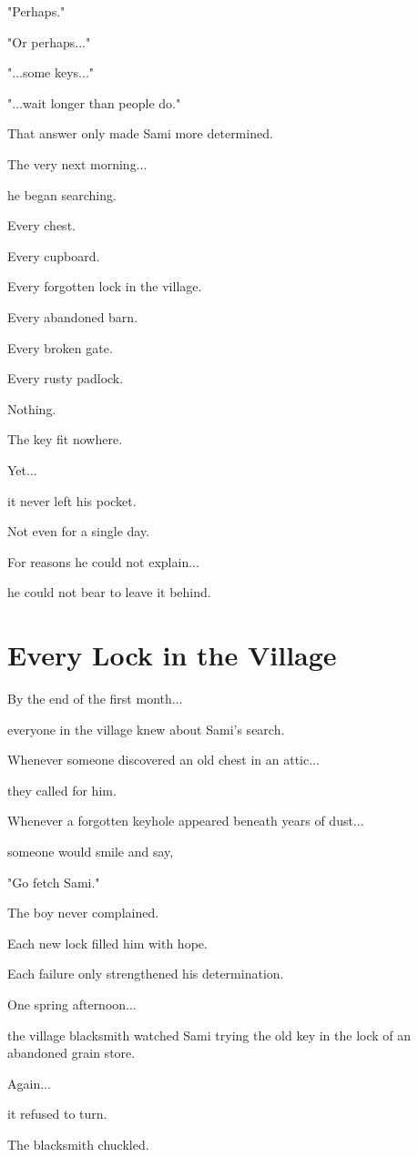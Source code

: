 \documentclass[12pt,openany]{book}
\begin{document}
"Perhaps."

"Or perhaps..."

"...some keys..."

"...wait longer than people do."

That answer only made Sami more determined.

The very next morning...

he began searching.

Every chest.

Every cupboard.

Every forgotten lock in the village.

Every abandoned barn.

Every broken gate.

Every rusty padlock.

Nothing.

The key fit nowhere.

Yet...

it never left his pocket.

Not even for a single day.

For reasons he could not explain...

he could not bear to leave it behind.
\section*{Every Lock in the Village}

By the end of the first month...

everyone in the village knew about Sami's search.

Whenever someone discovered an old chest in an attic...

they called for him.

Whenever a forgotten keyhole appeared beneath years of dust...

someone would smile and say,

"Go fetch Sami."

The boy never complained.

Each new lock filled him with hope.

Each failure only strengthened his determination.

One spring afternoon...

the village blacksmith watched Sami trying the old key in the lock of an abandoned grain store.

Again...

it refused to turn.

The blacksmith chuckled.
\end{document}
